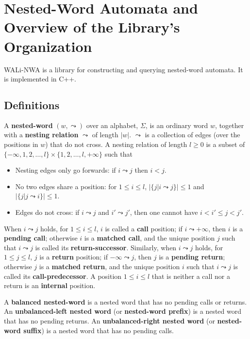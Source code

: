\section{Nested-Word Automata and Overview of the Library's Organization}
\label{Se:Nested Word Automata}

WALi-NWA is a library for constructing and querying nested-word automata.  It
is implemented in C++.

\subsection{Definitions}
\label{Se:Def}

\begin{definition}
  \label{De:nested word}

  A \textbf{nested-word} $(w,\leadsto)$ over an alphabet, $\Sigma$, is an
  ordinary word $w$, together with a \textbf{nesting relation} $\leadsto$ of
  length $|w|$.  $\leadsto$ is a collection of edges (over the positions in
  $w$) that do not cross.  A nesting relation of length $l \geq 0$ is a
  subset of $\{-\infty,1,2,\ldots,l\} \times \{1,2,\ldots,l,+\infty\}$ such
  that

  \begin{itemize}
    \item Nesting edges only go forwards: if $i \leadsto j$ then $i < j$.
    \item No two edges share a position: for $1 \leq i \leq l$, $|\{j | i
      \leadsto j \}| \leq 1$ and $|\{ j | j \leadsto i \}| \leq 1$.
    \item Edges do not cross: if $i \leadsto j$ and $i' \leadsto j'$, then
      one cannot have $i < i' \leq j < j'$.
  \end{itemize}

  When $i \leadsto j$ holds, for $1 \leq i \leq l$, $i$ is called a
  \textbf{call} position; if $i \leadsto +\infty$, then $i$ is a
  \textbf{pending call}; otherwise $i$ is a \textbf{matched call}, and the
  unique position $j$ such that $i \leadsto j$ is called its
  \textbf{return-successor}.  Similarly, when $i \leadsto j$ holds, for $1
  \leq j \leq l$, $j$ is a \textbf{return} position; if $-\infty \leadsto j$,
  then $j$ is a \textbf{pending return}; otherwise $j$ is a \textbf{matched
    return}, and the unique position $i$ such that $i \leadsto j$ is called
  its \textbf{call-predecessor}.  A position $1 \leq i \leq l$ that is
  neither a call nor a return is an \textbf{internal} position.

  A \textbf{balanced nested-word} is a nested word that has no pending calls
  or returns.  An \textbf{unbalanced-left nested word} (or
  \textbf{nested-word prefix}) is a nested word that has no pending returns.
  An \textbf{unbalanced-right nested word} (or \textbf{nested-word suffix})
  is a nested word that has no pending calls.

\end{definition}

